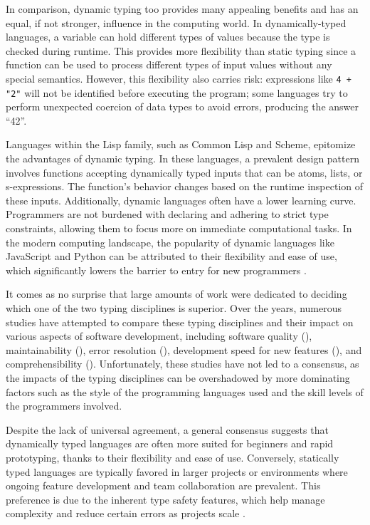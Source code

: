In comparison, dynamic typing too provides many appealing benefits and has an equal, if not stronger, influence in the computing world. In dynamically-typed languages, a variable can hold different types of values because the type is checked during runtime. This provides more flexibility than static typing since a function can be used to process different types of input values without any special semantics. However, this flexibility also carries risk: expressions like \texttt{4 + "2"} will not be identified before executing the program; some languages try to perform unexpected coercion of data types to avoid errors, producing the answer ``42''. 

Languages within the Lisp family, such as Common Lisp and Scheme, epitomize the advantages of dynamic typing. In these languages, a prevalent design pattern involves functions accepting dynamically typed inputs that can be atoms, lists, or s-expressions. The function's behavior changes based on the runtime inspection of these inputs. Additionally, dynamic languages often have a lower learning curve. Programmers are not burdened with declaring and adhering to strict type constraints, allowing them to focus more on immediate computational tasks. In the modern computing landscape, the popularity of dynamic languages like JavaScript and Python can be attributed to their flexibility and ease of use, which significantly lowers the barrier to entry for new programmers \cite{Chatley2019-uq}.


It comes as no surprise that large amounts of work were dedicated to deciding which one of the two typing disciplines is superior. Over the years, numerous studies have attempted to compare these typing disciplines and their impact on various aspects of software development, including software quality (\cite{Ray2017-gq, Gao2017-xn}), maintainability (\cite{Kleinschmager2012-bg}), error resolution (\cite{Prechelt1998-pd}), development speed for new features (\cite{Prechelt2000-bf, Mayer2012-qc}), and comprehensibility (\cite{Endrikat2014-uz}). Unfortunately, these studies have not led to a consensus, as the impacts of the typing disciplines can be overshadowed by more dominating factors such as the style of the programming languages used and the skill levels of the programmers involved.

Despite the lack of universal agreement, a general consensus suggests that dynamically typed languages are often more suited for beginners and rapid prototyping, thanks to their flexibility and ease of use. Conversely, statically typed languages are typically favored in larger projects or environments where ongoing feature development and team collaboration are prevalent. This preference is due to the inherent type safety features, which help manage complexity and reduce certain errors as projects scale \cite{Chatley2019-uq}.


